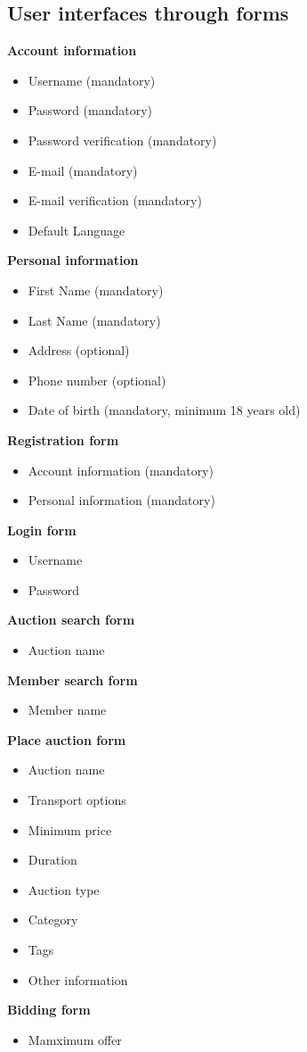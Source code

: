 \documentclass[a4paper, 12pt]{report}
\begin{document}
	\subsection{User interfaces through forms}
	\textbf{Account information} \\
		\begin{itemize}
			\item Username (mandatory)
			\item Password (mandatory)
			\item Password verification (mandatory)
			\item E-mail (mandatory)
			\item E-mail verification (mandatory)
			\item Default Language
		\end{itemize}
	\textbf{Personal information}
		\begin{itemize}
			\item First Name (mandatory)
			\item Last Name (mandatory)
			\item Address (optional)
			\item Phone number (optional)
			\item Date of birth (mandatory, minimum 18 years old)
		\end{itemize}
	\textbf{Registration form}
		\begin{itemize}
			\item Account information (mandatory)
			\item Personal information (mandatory)
		\end{itemize}
	\textbf{Login form}
		\begin{itemize}
			\item Username
			\item Password
		\end{itemize}
	\textbf{Auction search form}
		\begin{itemize}
			\item Auction name
		\end{itemize}
	\textbf{Member search form}
		\begin{itemize}
			\item Member name
		\end{itemize}
	\textbf{Place auction form}
		\begin{itemize}
			\item Auction name
			\item Transport options
			\item Minimum price
			\item Duration
			\item Auction type
			\item Category
			\item Tags
			\item Other information
		\end{itemize}
	\textbf{Bidding form}
		\begin{itemize}
			\item Mamximum offer
		\end{itemize}
\end{document}
